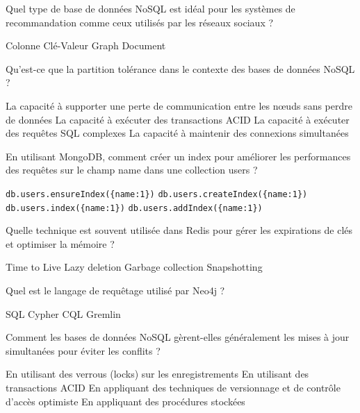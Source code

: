 \documentclass[12pt,a4paper,addpoints,answers]{exam}
\begin{document}
\begin{questions}
		\question[1] Quel type de base de données NoSQL est idéal pour les systèmes de recommandation comme ceux utilisés par les réseaux sociaux ?
		\begin{checkboxes}
			\choice Colonne
			\choice Clé-Valeur
			\CorrectChoice Graph
			\choice Document
		\end{checkboxes}
		
		\question[1] Qu'est-ce que la partition tolérance dans le contexte des bases de données NoSQL ?
		\begin{checkboxes}
			\CorrectChoice La capacité à supporter une perte de communication entre les nœuds sans perdre de données
			\choice La capacité à exécuter des transactions ACID
			\choice La capacité à exécuter des requêtes SQL complexes
			\choice La capacité à maintenir des connexions simultanées
		\end{checkboxes}
		
		\question[1] En utilisant MongoDB, comment créer un index pour améliorer les performances des requêtes sur le champ name dans une collection users ?
		\begin{checkboxes}
			\choice \texttt{db.users.ensureIndex(\{name:1\})}
			\CorrectChoice \texttt{db.users.createIndex(\{name:1\})}
			\choice \texttt{db.users.index(\{name:1\})}
			\choice \texttt{db.users.addIndex(\{name:1\})}
		\end{checkboxes}
		
		\question[1] Quelle technique est souvent utilisée dans Redis pour gérer les expirations de clés et optimiser la mémoire ?
		\begin{checkboxes}
			\CorrectChoice Time to Live
			\choice Lazy deletion
			\choice Garbage collection
			\choice Snapshotting
		\end{checkboxes}
		
		\question[1] Quel est le langage de requêtage utilisé par Neo4j ?
		\begin{checkboxes}
			\choice SQL
			\CorrectChoice Cypher
			\choice CQL
			\choice Gremlin
		\end{checkboxes}
		
		\question[1] Comment les bases de données NoSQL gèrent-elles généralement les mises à jour simultanées pour éviter les conflits ?
		\begin{checkboxes}
			\choice  En utilisant des verrous (locks) sur les enregistrements
			\choice En utilisant des transactions ACID
			\CorrectChoice En appliquant des techniques de versionnage et de contrôle d'accès optimiste 
			\choice En appliquant des procédures stockées
		\end{checkboxes}
		

\end{questions}
\end{document}
